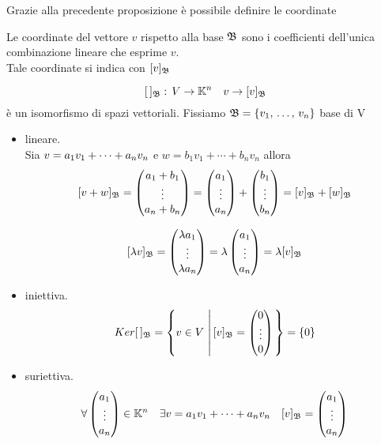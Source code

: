 Grazie alla precedente proposizione \`e possibile definire le coordinate
\begin{defn}[Coordinate] \bianco 
Le coordinate del vettore $v$ rispetto alla base $\mathfrak{B}$ sono i coefficienti dell'unica combinazione lineare che esprime $v$.\\
Tale coordinate si indica con $\displaystyle [v]_{\mathfrak{B}} $
\end{defn}
\spazio
\begin{prop} $$[\,]_{\mathfrak{B}} : \, V \to \mathbb{K}^n \quad v \to [v]_{\mathfrak{B}}$$
è un isomorfismo di spazi vettoriali.
\proof Fissiamo $\mathfrak{B}=\{ v_1, \, \dots , \, v_n \} $ base di V  
\begin{itemize}
\item lineare.\\
Sia $v=a_1 v_1 + \dots + a_n v_n $ e $w=b_1v_1+ \cdots + b_n v_n $ allora
$$ [ v+ w]_{\mathfrak{B}} =\begin{pmatrix}
a_1+ b_1 \\ \vdots \\ a_n+  b_n 
\end{pmatrix}= \begin{pmatrix}a_1\\ \vdots \\ a_n 
\end{pmatrix} + \begin{pmatrix}
b_1\\ \vdots \\ b_n 
\end{pmatrix} = [v]_{\mathfrak{B}} + [w]_{\mathfrak{B}} $$


$$ [ \lambda v]_{\mathfrak{B}} =\begin{pmatrix}
\lambda a_1 \\ \vdots \\ \lambda a_n  
\end{pmatrix}= \lambda \begin{pmatrix}a_1\\ \vdots \\ a_n 
\end{pmatrix} =\lambda [v]_{\mathfrak{B}}  $$
\item iniettiva.\\
$$Ker [\, ]_{\mathfrak{B}} = \left\{ v \in V \, \left| \,[v]_{\mathfrak{B}} = \begin{pmatrix}
0 \\ \vdots \\ 0
\end{pmatrix} \right. \right\} =\{ 0 \} $$
\item suriettiva.\\
$$ \forall \begin{pmatrix}
a_1 \\ \vdots \\ a_n
\end{pmatrix} \in \mathbb{K} ^ n  \quad \exists v= a_1 v_1 + \dots + a_n v_n \quad [v]_{\mathfrak{B}}=\begin{pmatrix}
a_1 \\ \vdots \\ a_n
\end{pmatrix}$$
\end{itemize}

\end{prop}

